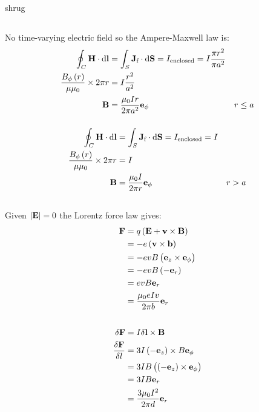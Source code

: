 shrug
\subsection{}
\subsubsection{}
No time-varying electric field so the Ampere-Maxwell law is:
\begin{align*}
    \oint_C \mathbf{H} \cdot \dif \mathbf{l} & = \int_S \mathbf{J}_{\textrm{f}} \cdot \dif \mathbf{S} = I_{\textrm{enclosed}} = I \frac{\pi r^2}{\pi a^2}\\
    \frac{B_{\phi} \del{r}}{\mu \mu_0} \times 2 \pi r & = I \frac{r^2}{a^2}\\
    \mathbf{B} & = \frac{\mu_0 I r}{2 \pi a^2} \mathbf{e}_{\phi} & r \leq a
\end{align*}

\subsubsection{}
\begin{align*}
    \oint_C \mathbf{H} \cdot \dif \mathbf{l} & = \int_S \mathbf{J}_{\textrm{f}} \cdot \dif \mathbf{S} = I_{\textrm{enclosed}} = I\\
    \frac{B_{\phi} \del{r}}{\mu \mu_0} \times 2 \pi r & = I\\
    \mathbf{B} & = \frac{\mu_0 I}{2 \pi r} \mathbf{e}_{\phi} & r > a
\end{align*}

\subsection{}
Given $ \abs{\mathbf{E}} = 0 $ the Lorentz force law gives:
\begin{align*}
    \mathbf{F} & = q \del{\mathbf{E} + \mathbf{v} \times \mathbf{B}}\\
    & = -e \del{\mathbf{v} \times \mathbf{b}}\\
    & = -evB \del{\mathbf{e}_z \times \mathbf{e}_{\phi}}\\
    & = -evB \del{- \mathbf{e}_r}\\
    & = evB \mathbf{e}_r\\
    & = \frac{\mu_0 e I v}{2 \pi b}\mathbf{e}_r
\end{align*}

\subsection{}
\begin{align*}
    \delta \mathbf{F} & = I \delta \mathbf{l} \times \mathbf{B}\\
    \frac{\delta \mathbf{F}}{\delta l} & = 3I \del{- \mathbf{e}_z} \times B \mathbf{e}_{\phi}\\
    & = 3IB \del{\del{- \mathbf{e}_z} \times \mathbf{e}_{\phi}}\\
    & = 3IB \mathbf{e}_r\\
    & = \frac{3 \mu_0 I^2}{2 \pi d} \mathbf{e}_r
\end{align*}
